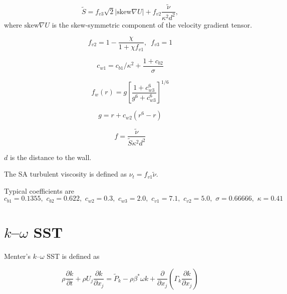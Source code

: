 \begin{equation}
    \tilde{S} = f_{v3}\sqrt{2} | \mathrm{skew} \nabla U |
    + f_{v2} \frac{\tilde{\nu}}{\kappa^2 d^2},
\end{equation}
where $\mathrm{skew} \nabla U$ is the skew-symmetric component of the velocity gradient
tensor.

\begin{equation}
    f_{v2} = 1 - \frac{\chi}{1 + \chi f_{v1}}, \, \, \,
    f_{v3} = 1
\end{equation}

\begin{equation}
    c_{w1} = c_{b1}/\kappa^2 + \frac{1 + c_{b2}}{\sigma}
\end{equation}

\begin{equation}
    f_w(r) = g \left[ \frac{1 + c_{w3}^6}{g^6 + c_{w3}^6} \right]^{1/6}
\end{equation}

\begin{equation}
    g = r + c_{w2} (r^6 - r)
\end{equation}

\begin{equation}
    f = \frac{\tilde{\nu}}{\tilde{S} \kappa^2 d^2}
\end{equation}

$d$ is the distance to the wall.

The SA turbulent viscosity is defined as $\nu_t = f_{v1} \tilde{\nu}$.

Typical coefficients are
\begin{equation}
    c_{b1} = 0.1355, \, \,
    c_{b2} = 0.622, \, \,
    c_{w2} = 0.3, \, \,
    c_{w3} = 2.0, \, \,
    c_{v1} = 7.1, \, \,
    c_{v2} = 5.0, \, \,
    \sigma = 0.66666, \, \,
    \kappa = 0.41
\end{equation}


\section{$k$--$\omega$ SST}

Menter's $k$--$\omega$ SST is defined as \cite{Menter2001}

\begin{equation}
    \rho \frac{\partial k}{\partial t}
    + \rho U_j \frac{\partial k}{\partial x_j}
    = \tilde{P}_k - \rho \beta^* \omega k
    + \frac{\partial}{\partial x_j}
    \left(
    \Gamma_k \frac{\partial k}{\partial x_j}
    \right)
    \label{eq:komegasst-k}
\end{equation}

